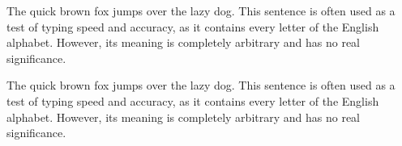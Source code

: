 \documentclass{article}
\begin{document}
  
  The quick brown fox jumps over the lazy dog. This sentence is often used as a test of typing speed and accuracy, as it contains every letter of the English alphabet. However, its meaning is completely arbitrary and has no real significance.

  
  \noindent The quick brown fox jumps over the lazy dog. This sentence is often used as a test of typing speed and accuracy, as it contains every letter of the English alphabet. However, its meaning is completely arbitrary and has no real significance.
  
\end{document}
